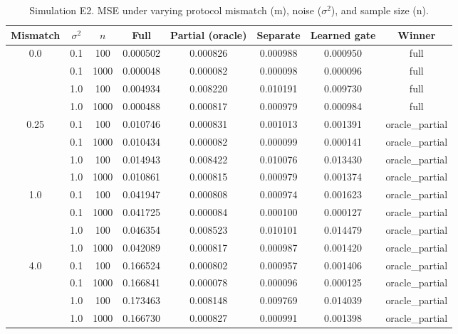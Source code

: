 \begin{table}[htbp]
\centering
\caption{Simulation E2. MSE under varying protocol mismatch (m), noise ($\sigma^2$), and sample size (n).}
\label{tab:simulation}
\begin{tabular}{cccccccc}
\toprule
Mismatch & $\sigma^2$ & $n$ & Full & Partial (oracle) & Separate & Learned gate & Winner \\
\midrule
0.0 & 0.1 & 100 & 0.000502 & 0.000826 & 0.000988 & 0.000950 & full \\
 & 0.1 & 1000 & 0.000048 & 0.000082 & 0.000098 & 0.000096 & full \\
 & 1.0 & 100 & 0.004934 & 0.008220 & 0.010191 & 0.009730 & full \\
 & 1.0 & 1000 & 0.000488 & 0.000817 & 0.000979 & 0.000984 & full \\
 \midrule
0.25 & 0.1 & 100 & 0.010746 & 0.000831 & 0.001013 & 0.001391 & oracle_partial \\
 & 0.1 & 1000 & 0.010434 & 0.000082 & 0.000099 & 0.000141 & oracle_partial \\
 & 1.0 & 100 & 0.014943 & 0.008422 & 0.010076 & 0.013430 & oracle_partial \\
 & 1.0 & 1000 & 0.010861 & 0.000815 & 0.000979 & 0.001374 & oracle_partial \\
 \midrule
1.0 & 0.1 & 100 & 0.041947 & 0.000808 & 0.000974 & 0.001623 & oracle_partial \\
 & 0.1 & 1000 & 0.041725 & 0.000084 & 0.000100 & 0.000127 & oracle_partial \\
 & 1.0 & 100 & 0.046354 & 0.008523 & 0.010101 & 0.014479 & oracle_partial \\
 & 1.0 & 1000 & 0.042089 & 0.000817 & 0.000987 & 0.001420 & oracle_partial \\
 \midrule
4.0 & 0.1 & 100 & 0.166524 & 0.000802 & 0.000957 & 0.001406 & oracle_partial \\
 & 0.1 & 1000 & 0.166841 & 0.000078 & 0.000096 & 0.000125 & oracle_partial \\
 & 1.0 & 100 & 0.173463 & 0.008148 & 0.009769 & 0.014039 & oracle_partial \\
 & 1.0 & 1000 & 0.166730 & 0.000827 & 0.000991 & 0.001398 & oracle_partial \\
\bottomrule
\end{tabular}
\end{table}
